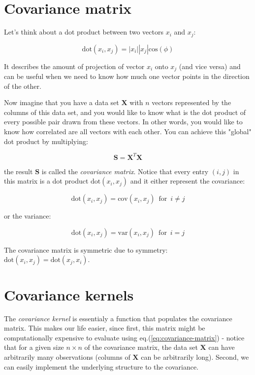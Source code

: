 \documentclass[10pt,twocolumn]{article}
\begin{document}
\section{Covariance matrix}

Let's think about a dot product between two vectors $x_i$ and $x_j$:

\begin{equation}
\text{dot}(x_i, x_j) = |x_i| |x_j| \text{cos}(\phi)
\end{equation}

It describes the amount of projection of vector $x_i$ onto $x_j$ (and vice versa) and can be useful when we need to know how much one vector points in the direction of the other.

Now imagine that you have a data set $\mathbf{X}$ with $n$ vectors represented by the columns of this data set, and you would like to know what is the dot product of every possible pair drawn from these vectors. In other words, you would like to know how correlated are all vectors with each other. You can achieve this "global" dot product by multiplying:

\begin{equation}\label{eq:covariance-matrix}
\mathbf{S} = \mathbf{X}^T \mathbf{X} 
\end{equation}

the result $\mathbf{S}$ is called the \textit{covariance matrix}. Notice that every entry $(i,j)$ in this matrix is a dot product $\text{dot}(x_i, x_j)$ and it either represent the covariance:

\begin{equation}
\text{dot}(x_i, x_j) = \text{cov}(x_i, x_j) \,\,\, \text{for} \,\,\, i \neq j
\end{equation}

or the variance:

\begin{equation}
\text{dot}(x_i, x_j) = \text{var}(x_i, x_j) \,\,\, \text{for} \,\,\, i = j
\end{equation}

The covariance matrix is symmetric due to symmetry: $\text{dot}(x_i, x_j) = \text{dot}(x_j, x_i)$.

\section{Covariance kernels}

The \textit{covariance kernel} is essentialy a function that populates the covariance matrix. This makes our life easier, since first, this matrix might be computationally expensive to evaluate using eq.(\ref{eq:covariance-matrix}) - notice that for a given size $n \times n$ of the covariance matrix, the data set $\mathbf{X}$ can have arbitrarily many observations (columns of $\mathbf{X}$ can be arbitrarily long). Second, we can easily implement the underlying structure to the covariance.
\end{document}

